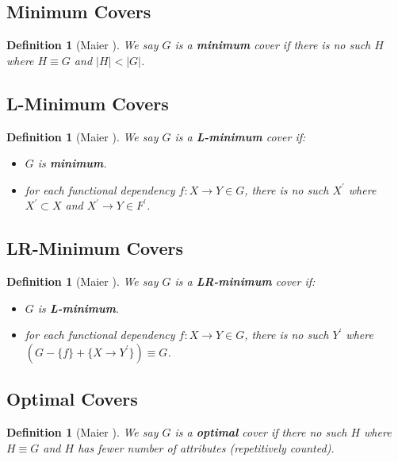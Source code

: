 \documentclass[11pt]{book}
\newtheorem{mydef}[thm]{Definition}
\begin{document}
\subsection{Minimum Covers}

\begin{mydef}[Maier \cite{maier1980minimum}]
We say $G$ is a \textbf{minimum} cover if there is no such $H$ where $H \equiv G$ and $\lvert H \rvert < \lvert G \rvert$.
\end{mydef}

\subsection{L-Minimum Covers}

\begin{mydef}[Maier \cite{maier1980minimum}]
We say $G$ is a \textbf{L-minimum} cover if:
  \begin{itemize}
  	\item $G$ is \textbf{minimum}.
  	\item for each functional dependency $f: X \rightarrow Y \in G$, there is no such $X^{'}$ where $X^{'} \subset X$ and $X^{'} \rightarrow Y \in F^{'}$.
  \end{itemize}
\end{mydef}

\subsection{LR-Minimum Covers}

\begin{mydef}[Maier \cite{maier1980minimum}]
We say $G$ is a \textbf{LR-minimum} cover if:
  \begin{itemize}
  	\item $G$ is \textbf{L-minimum}.
  	\item for each functional dependency $f: X \rightarrow Y \in G$, there is no such $Y^{'}$ where $(G - \{f\} + \{X \rightarrow Y^{'}\}) \equiv G$.
  \end{itemize}
\end{mydef}

\subsection{Optimal Covers}

\begin{mydef}[Maier \cite{maier1980minimum}]
We say $G$ is a \textbf{optimal} cover if there no such $H$ where $H \equiv G$ and $H$ has fewer number of attributes (repetitively counted).
\end{mydef}
\end{document}
